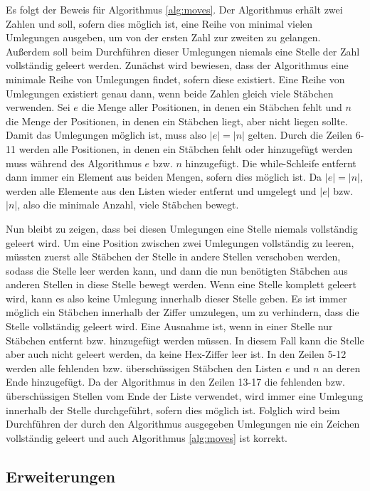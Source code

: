 \documentclass[a4paper,10pt,ngerman]{scrartcl}
\begin{document}
Es folgt der Beweis für Algorithmus \ref{alg:moves}.
Der Algorithmus erhält zwei Zahlen und soll, sofern dies möglich ist, eine Reihe von minimal vielen Umlegungen ausgeben, um von der ersten Zahl zur zweiten zu gelangen. Außerdem soll beim Durchführen dieser Umlegungen niemals eine Stelle der Zahl vollständig geleert werden. 
Zunächst wird bewiesen, dass der Algorithmus eine minimale Reihe von Umlegungen findet, sofern diese existiert. Eine Reihe von Umlegungen existiert genau dann, wenn beide Zahlen gleich viele Stäbchen verwenden. 
Sei $e$ die Menge aller Positionen, in denen ein Stäbchen fehlt und $n$ die Menge der Positionen, in denen ein Stäbchen liegt, aber nicht liegen sollte. 
Damit das Umlegungen möglich ist, muss also $|e| = |n|$ gelten. 
Durch die Zeilen 6-11 werden alle Positionen, in denen ein Stäbchen fehlt oder hinzugefügt werden muss während des Algorithmus $e$ bzw. $n$ hinzugefügt.
Die while-Schleife entfernt dann immer ein Element aus beiden Mengen, sofern dies möglich ist. 
Da $|e| = |n|$, werden  alle Elemente aus den Listen wieder entfernt und umgelegt und $|e|$ bzw. $|n|$, also die minimale Anzahl, viele Stäbchen bewegt. 

Nun bleibt zu zeigen, dass bei diesen Umlegungen eine Stelle niemals vollständig geleert wird.
Um eine Position zwischen zwei Umlegungen vollständig zu leeren, müssten zuerst alle Stäbchen der Stelle in andere Stellen verschoben werden, sodass die Stelle leer werden kann, und dann die nun benötigten Stäbchen aus anderen Stellen in diese Stelle bewegt werden. 
Wenn eine Stelle komplett geleert wird, kann es also keine Umlegung innerhalb dieser Stelle geben. 
Es ist immer möglich ein Stäbchen innerhalb der Ziffer umzulegen, um zu verhindern, dass die Stelle vollständig geleert wird. Eine Ausnahme ist, wenn in einer Stelle nur Stäbchen entfernt bzw. hinzugefügt werden müssen. In diesem Fall kann die Stelle aber auch nicht geleert werden, da keine Hex-Ziffer leer ist. 
In den Zeilen 5-12 werden alle fehlenden bzw. überschüssigen Stäbchen den Listen $e$ und $n$ an deren Ende hinzugefügt. 
Da der Algorithmus in den Zeilen 13-17 die fehlenden bzw. überschüssigen Stellen vom Ende der Liste verwendet, wird immer eine Umlegung innerhalb der Stelle durchgeführt, sofern dies möglich ist.
Folglich wird beim Durchführen der durch den Algorithmus ausgegeben Umlegungen nie ein Zeichen vollständig geleert und auch Algorithmus \ref{alg:moves} ist korrekt.

\subsection{Erweiterungen}
\end{document}
